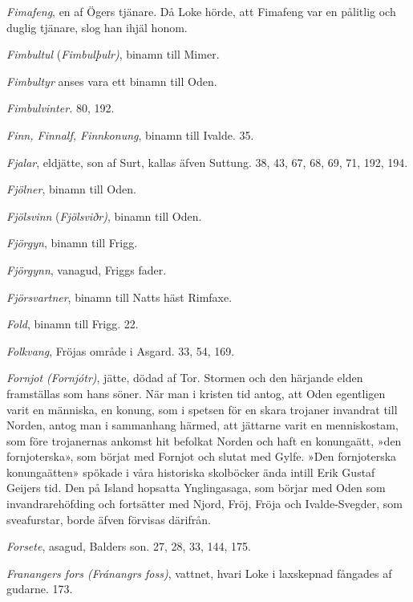 \emph{Fimafeng}, en af Ögers tjänare. Då Loke hörde, att Fimafeng var en
pålitlig och duglig tjänare, slog han ihjäl honom.

\emph{Fimbultul} (\emph{Fimbulþulr)}, binamn till Mimer.

\emph{Fimbultyr} anses vara ett binamn till Oden.

\emph{Fimbulvinter.} 80, 192.

\emph{Finn, Finnalf, Finnkonung}, binamn till Ivalde. 35.

\emph{Fjalar}, eldjätte, son af Surt, kallas äfven Suttung. 38, 43, 67,
68, 69, 71, 192, 194.

\emph{Fjölner}, binamn till Oden.

\emph{Fjölsvinn} (\emph{Fjölsviðr)}, binamn till Oden.

\emph{Fjörgyn}, binamn till Frigg.

\emph{Fjörgynn}, vanagud, Friggs fader.

\emph{Fjörsvartner}, binamn till Natts häst Rimfaxe.

\emph{Fold}, binamn till Frigg. 22.

\protect\hypertarget{lb1625905.xhtmlux5cux23start216}{}{}\protect\hypertarget{lb1625905.xhtmlux5cux23start216-a}{}{}\protect\hypertarget{lb1625905.xhtmlux5cux23start216-b}{}{}\protect\hypertarget{lb1625905.xhtmlux5cux23start216-c}{}{}\protect\hypertarget{lb1625905.xhtmlux5cux23start216-d}{}{}

\emph{Folkvang}, Fröjas område i Asgard. 33, 54, 169.

\emph{Fornjot (Fornjótr)}, jätte, dödad af Tor. Stormen och den härjande
elden framställas som hans söner. När man i kristen tid antog, att Oden
egentligen varit en människa, en konung, som i spetsen för en skara
trojaner invandrat till Norden, antog man i sammanhang härmed, att
jättarne varit en menniskostam, som före trojanernas ankomst hit
befolkat Norden och haft en konungaätt, »den fornjoterska», som börjat
med Fornjot och slutat med Gylfe. »Den fornjoterska konungaätten»
spökade i våra historiska skolböcker ända intill Erik Gustaf Geijers
tid. Den på Island hopsatta Ynglingasaga, som börjar med Oden som
invandrarehöfding och fortsätter med Njord, Fröj, Fröja och
Ivalde-Svegder, som sveafurstar, borde äfven förvisas därifrån.

\emph{Forsete}, asagud, Balders son. 27, 28, 33, 144, 175.

\emph{Franangers fors (Fránangrs foss)}, vattnet, hvari Loke i
laxskepnad fångades af gudarne. 173.

